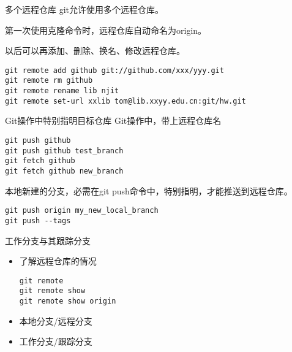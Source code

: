 \begin{frame}[fragile]{多个远程仓库}
git允许使用多个远程仓库。

第一次使用克隆命令时，远程仓库自动命名为origin。

以后可以再添加、删除、换名、修改远程仓库。

\begin{Verbatim}[frame=single,commandchars=\\\{\}]
git remote add github git://github.com/xxx/yyy.git
git remote rm github
git remote rename lib njit
git remote set-url xxlib tom@lib.xxyy.edu.cn:git/hw.git
\end{Verbatim}
\end{frame}

\begin{frame}[fragile]{Git操作中特别指明目标仓库}
Git操作中，带上远程仓库名

\onslide<+->
\begin{Verbatim}[frame=single,commandchars=\\\{\}]
git push github
git push github test_branch
git fetch github
git fetch github new_branch
\end{Verbatim}

\onslide<+->
本地新建的分支，必需在git push命令中，特别指明，才能推送到远程仓库。

\begin{Verbatim}[frame=single,commandchars=\\\{\}]
git push origin my_new_local_branch
git push --tags
\end{Verbatim}
\end{frame}

\begin{frame}[<+->][fragile]{工作分支与其跟踪分支}
    \begin{itemize}
        \item 了解远程仓库的情况
        \begin{Verbatim}[frame=single,commandchars=\\\{\}]
git remote
git remote show
git remote show origin
        \end{Verbatim}
        \item 本地分支/远程分支
        \item 工作分支/跟踪分支
    \end{itemize}
\end{frame}

